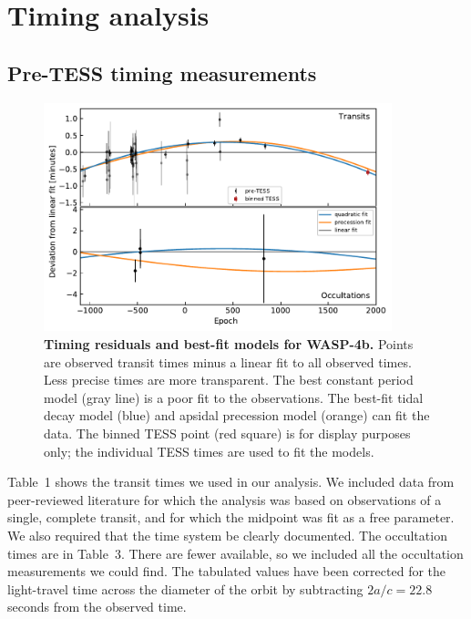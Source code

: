 \documentclass[12pt,twocolumn,tighten]{aastex62}
\begin{document}
\section{Timing analysis}
\label{sec:timing}

\subsection{Pre-TESS timing measurements}
\label{subsec:times}

\begin{figure}[t]
    \begin{center}
        \leavevmode
        \includegraphics[width=0.9\textwidth]{f3.pdf}
    \end{center}
    \vspace{-0.5cm}
    \caption{
        {\bf Timing residuals and best-fit models for WASP-4b.}
        Points are observed transit times minus a linear fit to all
        observed times.  Less precise times are more transparent.  The
        best constant period model (gray line) is a poor fit to the
        observations.  The best-fit tidal decay model (blue) and
        apsidal precession model (orange) can fit the data.  The
        binned TESS point (red square) is for display purposes only;
        the individual TESS times are used to fit the models.
        \label{fig:times}
    }
\end{figure}

Table~1 shows the transit times we used in our analysis.  We included
data from peer-reviewed literature for which the analysis was based on
observations of a single, complete transit, and for which the midpoint
was fit as a free parameter. We also required that the time system be
clearly documented.  The occultation times are in Table~3.  There are
fewer available, so we included all the occultation measurements we
could find. The tabulated values have been corrected for the
light-travel time across the diameter of the orbit by subtracting
$2a/c = 22.8$ seconds from the observed time.
\end{document}

